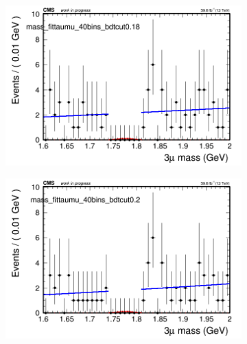 \begin{figure}[H]
\begin{subfigure}{0.2\textwidth}
        \caption{}
    \end{subfigure}
    \begin{subfigure}{0.2\textwidth}
        \includegraphics[width=\textwidth]{power_law/plots/taumu/massfit_taumu_40bins_bdtcut0.18.png}
        \caption{}
    \end{subfigure}
    \begin{subfigure}{0.2\textwidth}
        \includegraphics[width=\textwidth]{power_law/plots/taumu/massfit_taumu_40bins_bdtcut0.2.png}
        \caption{}
    \end{subfigure}
    \begin{subfigure}{0.2\textwidth}

\end{subfigure}
\end{figure}
